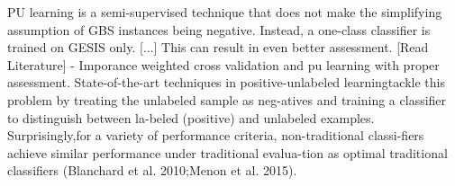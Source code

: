 PU learning is a semi-supervised technique that does not make the simplifying assumption of GBS instances being negative. Instead, a one-class classifier is trained on GESIS only. [...] This can result in even better assessment. [Read Literature] - Imporance weighted cross validation and pu learning with proper assessment. State-of-the-art techniques in positive-unlabeled learningtackle this problem by treating the unlabeled sample as neg-atives and training a classiﬁer to distinguish between la-beled (positive) and unlabeled examples. Surprisingly,for a variety of performance criteria, non-traditional classi-ﬁers achieve similar performance under traditional evalua-tion as optimal traditional classiﬁers (Blanchard et al. 2010;Menon et al. 2015). 

\vspace{0.4cm}



